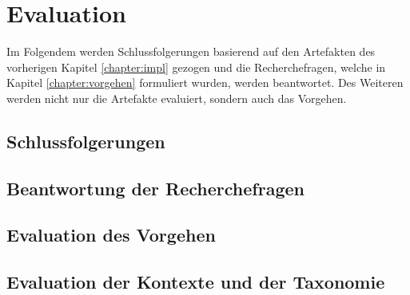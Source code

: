 \chapter{Evaluation}
\label{chapter:evaluation}
Im Folgendem werden Schlussfolgerungen basierend auf den Artefakten des vorherigen Kapitel \ref{chapter:impl} gezogen und die Recherchefragen, welche in Kapitel \ref{chapter:vorgehen} formuliert wurden, werden beantwortet. Des Weiteren werden nicht nur die Artefakte evaluiert, sondern auch das Vorgehen. \\

\section{Schlussfolgerungen}

\section{Beantwortung der Recherchefragen}

\section{Evaluation des Vorgehen}

\section{Evaluation der Kontexte und der Taxonomie}


